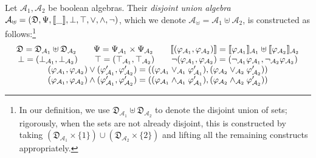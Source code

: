 \begin{definition}
    Let $\mathcal{A}_1, \mathcal{A}_2$ be boolean algebras.
    Their \emph{disjoint union algebra}
    $\mathcal{A}_\uplus = (\mathfrak{D}, \Psi, \llbracket {\_} \rrbracket, \bot, \top, \vee, \wedge, \neg)$,
    which we denote $\mathcal{A}_\uplus = \mathcal{A}_1 \uplus \mathcal{A}_2$,
    is constructed as follows:\footnote{In our definition, we use
    $\mathfrak{D}_{\mathcal{A}_1} \uplus \mathfrak{D}_{\mathcal{A}_2}$
    to denote the disjoint union of sets; rigorously, 
    when the sets are not already disjoint,
    this is constructed by taking
    $(\mathfrak{D}_{\mathcal{A}_1} \times \{1\}) \cup
    (\mathfrak{D}_{\mathcal{A}_2} \times \{2\})$ and lifting
    all the remaining constructs appropriately.}
    $$
    \begin{array}{c}
        \mathfrak{D} = \mathfrak{D}_{\mathcal{A}_1} \uplus \mathfrak{D}_{\mathcal{A}_2} \qquad
        \Psi = \Psi_{\mathcal{A}_1} \times \Psi_{\mathcal{A}_2} \qquad
        \llbracket {(\varphi_{\mathcal{A}_1}, \varphi_{\mathcal{A}_2})} \rrbracket = 
            \llbracket {\varphi_{\mathcal{A}_1}} \rrbracket_{\mathcal{A}_1} \uplus
            \llbracket {\varphi_{\mathcal{A}_2}} \rrbracket_{\mathcal{A}_2} \\
        \bot = (\bot_{\mathcal{A}_1}, \bot_{\mathcal{A}_2}) \qquad
        \top = (\top_{\mathcal{A}_1}, \top_{\mathcal{A}_2}) \qquad
        \neg (\varphi_{\mathcal{A}_1}, \varphi_{\mathcal{A}_2}) =
            (\neg_{\mathcal{A}_1} \varphi_{\mathcal{A}_1},
            \neg_{\mathcal{A}_2} \varphi_{\mathcal{A}_2})\\
        (\varphi_{\mathcal{A}_1}, \varphi_{\mathcal{A}_2}) \vee
            (\varphi_{\mathcal{A}_1}', \varphi_{\mathcal{A}_2}') = 
            ((\varphi_{\mathcal{A}_1} \vee_{\mathcal{A}_1} \varphi_{\mathcal{A}_1}'),
            (\varphi_{\mathcal{A}_2} \vee_{\mathcal{A}_2} \varphi_{\mathcal{A}_2}')) \\
        (\varphi_{\mathcal{A}_1}, \varphi_{\mathcal{A}_2}) \wedge
            (\varphi_{\mathcal{A}_1}', \varphi_{\mathcal{A}_2}') = 
            ((\varphi_{\mathcal{A}_1} \wedge_{\mathcal{A}_1} \varphi_{\mathcal{A}_1}'),
            (\varphi_{\mathcal{A}_2} \wedge_{\mathcal{A}_2} \varphi_{\mathcal{A}_2}')) \\        
    \end{array}
    $$
\end{definition}

